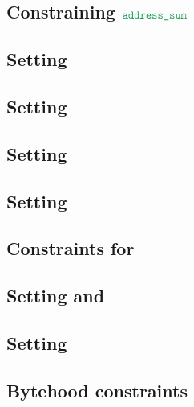 \subsection{Constraining $\locAddressSum$}                                  \label{bls: address sum}                                        
\subsection{Setting \blsPhase{}}                                            \label{bls: setting phase}                                      
\subsection{Setting \indexMax{}}                                            \label{bls: setting index max}                                  
\subsection{Setting \blsIndex{}}                                            \label{bls: setting index}                                      
\subsection{Setting           \maxCt{}}                                     \label{bls: setting ct_max}                                     
\subsection{Constraints for \ct{}}                                          \label{bls: setting ct}                                         
\subsection{Setting \isFirstInput{} and \isSecondInput{}}                   \label{bls: setting is_first and is_second}                     
\subsection{Setting \accInputs{}}                                           \label{bls: setting acc pairings}                               
\subsection{Bytehood constraints}                                           \label{bls: bytehood and accumulator}                           
